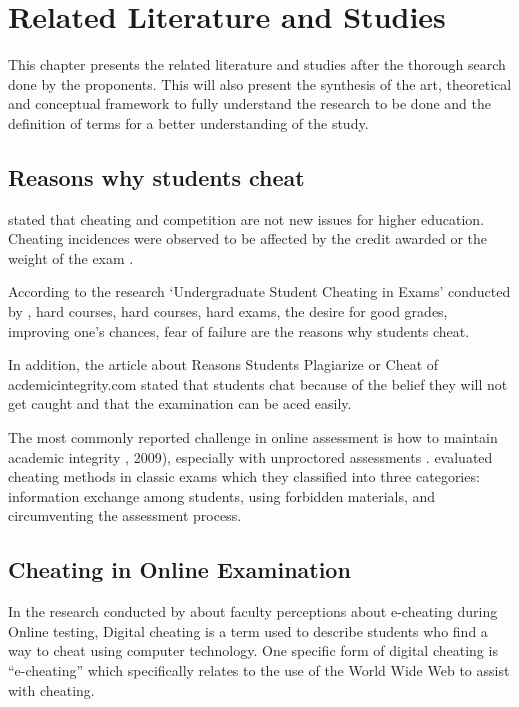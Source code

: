 \chapter{Related Literature and Studies}

This chapter presents the related literature and studies after the thorough search done by the proponents.
This will also present the synthesis of the art, theoretical and conceptual framework to fully understand the research to be done and the definition of terms for a better understanding of the study.

\section*{Reasons why students cheat}

 stated that cheating and competition are not new issues for higher education.
Cheating incidences were observed to be affected by the credit awarded or the weight of the exam \cite{weber1983cheating}.

According to the research ‘Undergraduate Student Cheating in Exams’ conducted by , hard courses, hard courses, hard exams, the desire for good grades, improving one’s chances, fear of failure are the reasons why students cheat.

In addition, the article about Reasons Students Plagiarize or Cheat of acdemicintegrity.com stated that students chat because of the belief they will not get caught and that the examination can be aced easily.

The most commonly reported challenge in online assessment is how to maintain academic integrity \cite{hollister2009proctored}, 2009), especially with unproctored assessments \cite{arnold2016cheating}.
 evaluated cheating methods in classic exams which they classified into three categories: information exchange among students, using forbidden materials, and circumventing the assessment process.

\section*{Cheating in Online Examination}

In the research conducted by  about faculty perceptions about e-cheating during Online testing, Digital cheating is a term used to describe students who find a way to cheat using computer technology.
One specific form of digital cheating is “e-cheating” which specifically relates to the use of the World Wide Web to assist with cheating.

